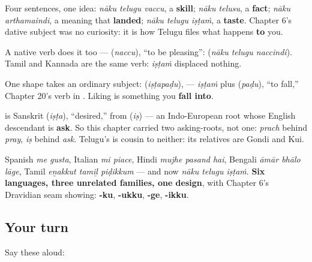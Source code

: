 \begin{grammarlens}[title={Grammar Lens: the fourth dative sentence, and two ways round it}]
Four sentences, one idea: \emph{nāku telugu vaccu}, a \textbf{skill}; \emph{nāku telusu}, a \textbf{fact}; \emph{nāku arthamaindi}, a meaning that \textbf{landed}; \emph{nāku telugu iṣṭaṁ}, a \textbf{taste}. Chapter 6's dative subject was no curiosity: it is how Telugu files what happens \textbf{to} you.

A native verb does it too — \textbf{} (\emph{naccu}), \textquotedblleft{}to be pleasing\textquotedblright{}: \textbf{  } (\emph{nāku telugu naccindi}). Tamil \textbf{} and Kannada \textbf{} are the same verb: \emph{iṣṭaṁ} displaced nothing.

One shape takes an ordinary subject: \textbf{} (\emph{iṣṭapaḍu}), \textbf{ } — \emph{iṣṭaṁ} plus \textbf{} (\emph{paḍu}), \textquotedblleft{}to fall,\textquotedblright{} Chapter 20's verb in \textbf{ }. Liking is something you \textbf{fall into}.
\end{grammarlens}

\begin{cousinweb}
\textbf{} is Sanskrit \textbf{} (\emph{iṣṭa}), \textquotedblleft{}desired,\textquotedblright{} from \textbf{} (\emph{iṣ}) — an Indo-European root whose English descendant is \textbf{ask}. So this chapter carried two asking-roots, not one: \emph{prach} behind \emph{pray}, \emph{iṣ} behind \emph{ask}. Telugu's \textbf{} is cousin to neither: its relatives are Gondi and Kui.

Spanish \emph{me gusta}, Italian \emph{mi piace}, Hindi \emph{mujhe pasand hai}, Bengali \emph{āmār bhālo lāge}, Tamil \emph{eṉakkut tamiḻ piḍikkum} — and now \emph{nāku telugu iṣṭaṁ}. \textbf{Six languages, three unrelated families, one design}, with Chapter 6's Dravidian seam showing: \textbf{-ku}, \textbf{-ukku}, \textbf{-ge}, \textbf{-ikku}.
\end{cousinweb}

\subsection*{Your turn}
Say these aloud:

